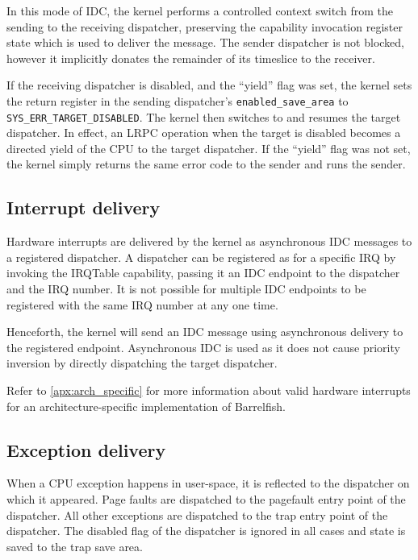 \documentclass[a4paper,11pt,twoside]{report}
\begin{document}
In this mode of IDC, the kernel performs a controlled
context switch from the sending to the receiving dispatcher,
preserving the capability invocation register state which is used to
deliver the message. The sender dispatcher is not blocked, however
it implicitly donates the remainder of its timeslice to the
receiver.

If the receiving dispatcher is disabled, and the ``yield'' flag was set,
the kernel sets the return
register in the sending dispatcher's \lstinline+enabled_save_area+
to \lstinline+SYS_ERR_TARGET_DISABLED+. The kernel then switches to
and resumes the target dispatcher. In effect, an LRPC
operation when the target is disabled becomes a directed yield of
the CPU to the target dispatcher. If the ``yield'' flag was not set,
the kernel simply returns the same error code to the sender and runs the
sender.

\subsection{Interrupt delivery}\label{sec:interrupts}

Hardware interrupts are delivered by the kernel as asynchronous IDC
messages to a registered dispatcher. A dispatcher can be registered
as for a specific IRQ by invoking the IRQTable capability,
passing it an IDC endpoint to the dispatcher and the IRQ
number. It is not possible for multiple IDC endpoints to be
registered with the same IRQ number at any one time.

Henceforth, the kernel will send an IDC message using asynchronous
delivery to the registered endpoint. Asynchronous
IDC is used as it does not cause priority inversion by directly
dispatching the target dispatcher.

Refer to \autoref{apx:arch_specific} for more information about
valid hardware interrupts for an architecture-specific
implementation of Barrelfish.

\subsection{Exception delivery}

When a CPU exception happens in user-space, it is reflected to the
dispatcher on which it appeared. Page
faults are dispatched to the pagefault entry point of the
dispatcher. All other exceptions are dispatched to the trap entry
point of the dispatcher. The disabled flag of the dispatcher is
ignored in all cases and state is saved to the trap save area.
\end{document}
